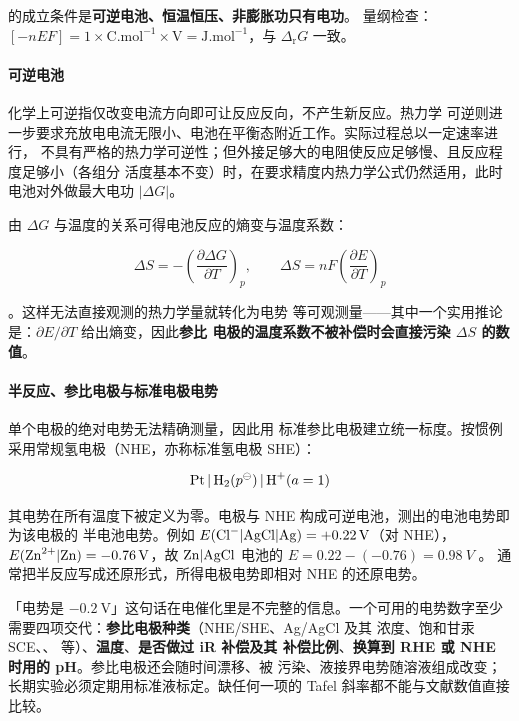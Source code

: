 \begin{keycond}
 的成立条件是\textbf{可逆电池、恒温恒压、非膨胀功只有电功}。
量纲检查：$[-nEF]=1\times\mathrm{C.mol^{-1}}\times\mathrm{V}
=\mathrm{J.mol^{-1}}$，与 $\Delta_{\mathrm{r}}G$ 一致。
\end{keycond}

\paragraph{可逆电池} 化学上可逆指仅改变电流方向即可让反应反向，不产生新反应。热力学
可逆则进一步要求充放电电流无限小、电池在平衡态附近工作。实际过程总以一定速率进行，
不具有严格的热力学可逆性；但外接足够大的电阻使反应足够慢、且反应程度足够小（各组分
活度基本不变）时，在要求精度内热力学公式仍然适用，此时电池对外做最大电功 $|\Delta G|$。

由 $\Delta G$ 与温度的关系可得电池反应的熵变与温度系数：

\begin{equation}
\Delta S=-\left(\frac{\partial \Delta G}{\partial T}\right)_{p},
\qquad
\Delta S=nF\left(\frac{\partial E}{\partial T}\right)_{p}
\label{eq:entropy-emf}
\end{equation}

。这样无法直接观测的热力学量就转化为电势
等可观测量——其中一个实用推论是：$\partial E/\partial T$ 给出熵变，因此\textbf{参比
电极的温度系数不被补偿时会直接污染 $\Delta S$ 的数值}。

\paragraph{半反应、参比电极与标准电极电势} 单个电极的绝对电势无法精确测量，因此用
标准参比电极建立统一标度。按惯例采用常规氢电极（NHE，亦称标准氢电极 SHE）：

\begin{equation}
\ce{Pt | H2}(p^\ominus)\,|\,\ce{H+}(a=1)
\label{eq:she}
\end{equation}

其电势在所有温度下被定义为零。电极与 NHE 构成可逆电池，测出的电池电势即为该电极的
半电池电势。例如 $E(\ce{Cl-}|\ce{AgCl}|\ce{Ag})=+\qty{0.22}{V}$（对 NHE），
$E(\ce{Zn^{2+}}|\ce{Zn})=-\qty{0.76}{V}$，故 $\ce{Zn|AgCl}$ 电池的
$E=0.22-(-0.76)=\qty{0.98}{V}$ 。
通常把半反应写成还原形式，所得电极电势即相对 NHE 的还原电势。

\begin{pitfall}
「电势是 $-0.2\ \mathrm{V}$」这句话在电催化里是不完整的信息。一个可用的电势数字至少
需要四项交代：\textbf{参比电极种类}（NHE/SHE、Ag/AgCl 及其  浓度、饱和甘汞
SCE、、 等）、\textbf{温度}、\textbf{是否做过 iR 补偿及其
补偿比例}、\textbf{换算到 RHE 或 NHE 时用的 pH}。参比电极还会随时间漂移、被 
污染、液接界电势随溶液组成改变；长期实验必须定期用标准液标定。缺任何一项的 Tafel
斜率都不能与文献数值直接比较。
\end{pitfall}

